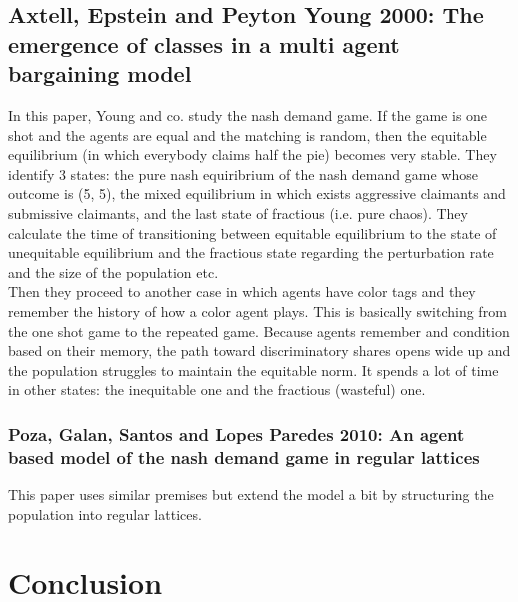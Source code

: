 \documentclass[12.5pt]{report}
\begin{document}
\section{Axtell, Epstein and Peyton Young 2000: The emergence of classes in a multi agent bargaining model}

In this paper, Young and co. study the nash demand game. If the game is one shot and the agents are equal and the matching is random, then the equitable equilibrium (in which everybody claims half the pie) becomes very stable. They identify 3 states: the pure nash equiribrium of the nash demand game whose outcome is (5, 5), the mixed equilibrium in which exists aggressive claimants and submissive claimants, and the last state of fractious (i.e. pure chaos). They calculate the time of transitioning between equitable equilibrium to the state of unequitable equilibrium and the fractious state regarding the perturbation rate and the size of the population etc. \\

Then they proceed to another case in which agents have color tags and they remember the history of how a color agent plays. This is basically switching from the one shot game to the repeated game. Because agents remember and condition based on their memory, the path toward discriminatory shares opens wide up and the population struggles to maintain the equitable norm. It spends a lot of time in other states: the inequitable one and the fractious (wasteful) one.

\subsection{Poza, Galan, Santos and Lopes Paredes 2010: An agent based model of the nash demand game in regular lattices}
This paper uses similar premises but extend the model a bit by structuring the population into regular lattices.


\chapter{Conclusion}
\end{document}
